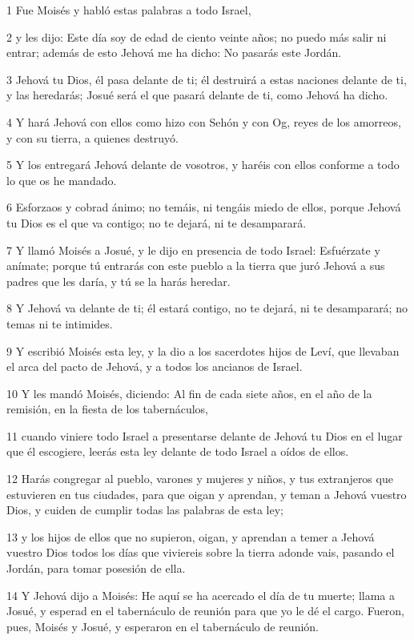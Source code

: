 \par 1 Fue Moisés y habló estas palabras a todo Israel,
\par 2 y les dijo: Este día soy de edad de ciento veinte años; no puedo más salir ni entrar; además de esto Jehová me ha dicho: No pasarás este Jordán.
\par 3 Jehová tu Dios, él pasa delante de ti; él destruirá a estas naciones delante de ti, y las heredarás; Josué será el que pasará delante de ti, como Jehová ha dicho.
\par 4 Y hará Jehová con ellos como hizo con Sehón y con Og, reyes de los amorreos, y con su tierra, a quienes destruyó. 
\par 5 Y los entregará Jehová delante de vosotros, y haréis con ellos conforme a todo lo que os he mandado.
\par 6 Esforzaos y cobrad ánimo; no temáis, ni tengáis miedo de ellos, porque Jehová tu Dios es el que va contigo; no te dejará, ni te desamparará.
\par 7 Y llamó Moisés a Josué, y le dijo en presencia de todo Israel: Esfuérzate y anímate; porque tú entrarás con este pueblo a la tierra que juró Jehová a sus padres que les daría, y tú se la harás heredar.
\par 8 Y Jehová va delante de ti; él estará contigo, no te dejará, ni te desamparará; no temas ni te intimides.
\par 9 Y escribió Moisés esta ley, y la dio a los sacerdotes hijos de Leví, que llevaban el arca del pacto de Jehová, y a todos los ancianos de Israel. 
\par 10 Y les mandó Moisés, diciendo: Al fin de cada siete años, en el año de la remisión, en la fiesta de los tabernáculos, 
\par 11 cuando viniere todo Israel a presentarse delante de Jehová tu Dios en el lugar que él escogiere, leerás esta ley delante de todo Israel a oídos de ellos.
\par 12 Harás congregar al pueblo, varones y mujeres y niños, y tus extranjeros que estuvieren en tus ciudades, para que oigan y aprendan, y teman a Jehová vuestro Dios, y cuiden de cumplir todas las palabras de esta ley;
\par 13 y los hijos de ellos que no supieron, oigan, y aprendan a temer a Jehová vuestro Dios todos los días que viviereis sobre la tierra adonde vais, pasando el Jordán, para tomar posesión de ella.
\par 14 Y Jehová dijo a Moisés: He aquí se ha acercado el día de tu muerte; llama a Josué, y esperad en el tabernáculo de reunión para que yo le dé el cargo. Fueron, pues, Moisés y Josué, y esperaron en el tabernáculo de reunión.
